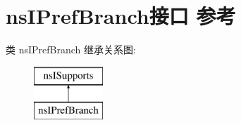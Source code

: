 \hypertarget{interfacens_i_pref_branch}{}\section{ns\+I\+Pref\+Branch接口 参考}
\label{interfacens_i_pref_branch}
类 ns\+I\+Pref\+Branch 继承关系图\+:\begin{figure}[H]
\begin{center}
\leavevmode
\includegraphics[height=2.000000cm]{interfacens_i_pref_branch}
\end{center}
\end{figure}
